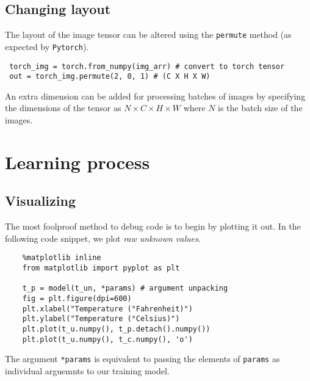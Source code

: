 \documentclass[11pt]{article}
\begin{document}
\subsection{Changing layout}
\label{sec:org77304ca}
The layout of the image tensor can be altered using the \texttt{permute} method (as expected by \texttt{Pytorch}).
\begin{verbatim}
 torch_img = torch.from_numpy(img_arr) # convert to torch tensor
 out = torch_img.permute(2, 0, 1) # (C X H X W)
\end{verbatim}
An extra dimension can be added for processing batches of images by specifying the dimensions of the tensor as \(N\times C\times H\times W\) where \(N\) is the batch size of the images.

\section{Learning process}
\label{sec:orgee53299}
\subsection{Visualizing}
\label{sec:org615514f}
The most foolproof method to debug code is to begin by plotting it out. In the following code snippet, we plot \emph{raw unknown values}.
\begin{verbatim}
    %matplotlib inline
    from matplotlib import pyplot as plt

    t_p = model(t_un, *params) # argument unpacking
    fig = plt.figure(dpi=600)
    plt.xlabel("Temperature (°Fahrenheit)")
    plt.ylabel("Temperature (°Celsius)")
    plt.plot(t_u.numpy(), t_p.detach().numpy())
    plt.plot(t_u.numpy(), t_c.numpy(), 'o')
\end{verbatim}
The argument \texttt{*params} is equivalent to passing the elements of \texttt{params} as individual arguemnts to our training model.
\end{document}
